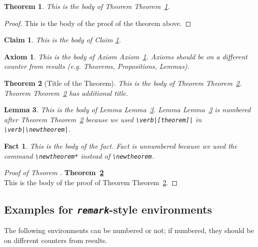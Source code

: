 \documentclass[qe,nameyear,draft]{econsocart}
\theoremstyle{plain}
\newtheorem{claim}{Claim}
\newtheorem*{fact}{Fact}
\newtheorem{theorem}{Theorem}[section]
\newtheorem{lemma}[theorem]{Lemma}
\newtheorem{axiom}{Axiom}[section]
\begin{document}
\begin{theorem}\label{th1}This is the body of Theorem Theorem~\ref{th1}.

\end{theorem}\begin{proof}This is the body of the proof of the theorem above.

\end{proof}
\begin{claim}\label{cl1}
This is the body of Claim \ref{cl1}. 
\end{claim}
\begin{axiom}\label{ax1}This is the body of Axiom Axiom~\ref{ax1}. Axioms should be on a different counter from results (e.g. Theorems, Propositions, Lemmas).

\end{axiom}\begin{theorem}[Title of the Theorem]\label{th2}This is the body of Theorem Theorem~\ref{th2}. Theorem Theorem~\ref{th2} has additional title.

\end{theorem}\begin{lemma}\label{le1}This is the body of Lemma Lemma~\ref{le1}. Lemma Lemma~\ref{le1} is numbered after
Theorem Theorem~\ref{th2} because we used \texttt{{\textbackslash}verb|[theorem]|} in \texttt{{\textbackslash}verb|{\textbackslash}newtheorem|}.

\end{lemma}
\begin{fact}
This is the body of the fact. Fact is unnumbered because we used the command \verb|\newtheorem*|
instead of \verb|\newtheorem|.
\end{fact}
\begin{proof}[Proof of Theorem ]\textbf{Theorem~\ref{th2}}\\
This is the body of the proof of Theorem Theorem~\ref{th2}.

\end{proof}\subsection{Examples for \textit{\texttt{remark}}-style environments}

The following environments can be numbered or not; if numbered, they should be on different counters from results.
\end{document}
